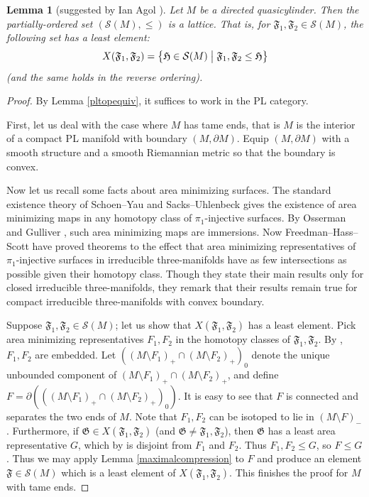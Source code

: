 \documentclass[12pt]{article}
\theoremstyle{plain}
\newtheorem{lemma}[theorem]{Lemma}
\theoremstyle{definition}
\theoremstyle{remark}
\numberwithin{equation}{section}
\begin{document}
\begin{lemma}[suggested by Ian Agol \cite{mathoverflow}]\label{lattice}
Let $M$ be a directed quasicylinder.  Then the partially-ordered set $(\mathcal S(M),\leq)$ is a lattice.  That is, for $\mathfrak F_1,\mathfrak F_2\in\mathcal S(M)$, the following set has a least element:
\begin{equation}
X(\mathfrak F_1,\mathfrak F_2)=\left\{\mathfrak H\in\mathcal S(M)\bigm|\mathfrak F_1,\mathfrak F_2\leq\mathfrak H\right\}
\end{equation}
(and the same holds in the reverse ordering).
\end{lemma}

\begin{proof}
By Lemma \ref{pltopequiv}, it suffices to work in the PL category.

First, let us deal with the case where $M$ has tame ends, that is $M$ is the interior of a compact PL manifold with boundary $(M,\partial M)$.  Equip $(M,\partial M)$ with a smooth structure and a smooth Riemannian metric so that the boundary is convex.

Now let us recall some facts about area minimizing surfaces.  The standard existence theory of Schoen--Yau \cite{schoenyau} and Sacks--Uhlenbeck \cite{sacksuhlenbeck,sacksuhlenbeck2} gives the existence of area minimizing maps in any homotopy class of $\pi_1$-injective surfaces.  By Osserman \cite{osserman1,osserman2} and Gulliver \cite{gulliver}, such area minimizing maps are immersions.  Now Freedman--Hass--Scott \cite{freedman} have proved theorems to the effect that area minimizing representatives of $\pi_1$-injective surfaces in irreducible three-manifolds have as few intersections as possible given their homotopy class.  Though they state their main results only for closed irreducible three-manifolds, they remark \cite[p634 \S 7]{freedman} that their results remain true for compact irreducible three-manifolds with convex boundary.

Suppose $\mathfrak F_1,\mathfrak F_2\in\mathcal S(M)$; let us show that $X(\mathfrak F_1,\mathfrak F_2)$ has a least element.  Pick area minimizing representatives $F_1,F_2$ in the homotopy classes of $\mathfrak F_1,\mathfrak F_2$.  By \cite[p626 Theorem 5.1]{freedman}, $F_1,F_2$ are embedded.  Let $((M\setminus F_1)_+\cap(M\setminus F_2)_+)_0$ denote the unique unbounded component of $(M\setminus F_1)_+\cap(M\setminus F_2)_+$, and define $F=\partial(((M\setminus F_1)_+\cap(M\setminus F_2)_+)_0)$.  It is easy to see that $F$ is connected and separates the two ends of $M$.  Note that $F_1,F_2$ can be isotoped to lie in $(M\setminus F)_-$.  Furthermore, if $\mathfrak G\in X(\mathfrak F_1,\mathfrak F_2)$ (and $\mathfrak G\ne\mathfrak F_1,\mathfrak F_2$), then $\mathfrak G$ has a least area representative $G$, which by \cite[p630 Theorem 6.2]{freedman} is disjoint from $F_1$ and $F_2$.  Thus $F_1,F_2\leq G$, so $F\leq G$.  Thus we may apply Lemma \ref{maximalcompression} to $F$ and produce an element $\mathfrak F\in\mathcal S(M)$ which is a least element of $X(\mathfrak F_1,\mathfrak F_2)$.  This finishes the proof for $M$ with tame ends.


\end{proof}
\end{document}
